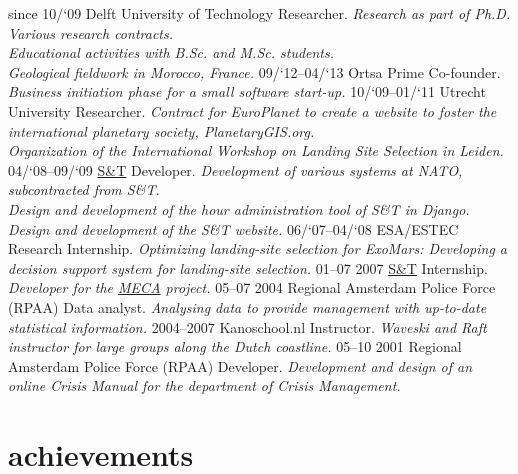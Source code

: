 \documentclass[]{friggeri-cv}
\begin{document}
\begin{entrylist}
  \entry
    {since 10/`09}
    {Delft University of Technology}
    {Researcher.}
    {\emph{Research as part of Ph.D. \\
    Various research contracts. \\
    Educational activities with B.Sc. and M.Sc. students. \\
    Geological fieldwork in Morocco, France. }}
  \entry
    {09/`12–04/`13}
    {Ortsa Prime}
    {Co-founder.}
    {\emph{Business initiation phase for a small software start-up.}}
  \entry
    {10/`09–01/`11}
    {Utrecht University}
    {Researcher.}
    {\emph{Contract for EuroPlanet to create a website to foster the international planetary society, PlanetaryGIS.org.\\
    Organization of the International Workshop on Landing Site Selection in Leiden. }}
  \entry
    {04/`08–09/`09}
    {\href{http://stcorp.nl}{S\&T}}
    {Developer.}
    {\emph{Development of various systems at NATO, subcontracted from S\&T. \\
           Design and development of the hour administration tool of S\&T in Django. \\
           Design and development of the S\&T website.
           }}
  \entry
    {06/`07–04/`08}
    {ESA/ESTEC}
    {Research Internship.}
    {\emph{Optimizing landing-site selection for ExoMars: Developing a decision support system for landing-site selection.}}
  \entry
    {01–07 2007}
    {\href{http://stcorp.nl}{S\&T}}
    {Internship.}
    {\emph{Developer for the \href{http://crewassistant.com}{MECA} project.}}
  \entry
    {05–07 2004}
    {Regional Amsterdam Police Force (RPAA)}
    {Data analyst.}
    {\emph{Analysing data to provide management with up-to-date statistical information.}}
  \entry
    {2004–2007}
    {Kanoschool.nl}
    {Instructor.}
    {\emph{Waveski and Raft instructor for large groups along the Dutch coastline.}}
  \entry
    {05–10 2001}
    {Regional Amsterdam Police Force (RPAA)}
    {Developer.}
    {\emph{Development and design of an online Crisis Manual for the department of Crisis Management.}}
\end{entrylist}

\section{achievements}
\end{document}
